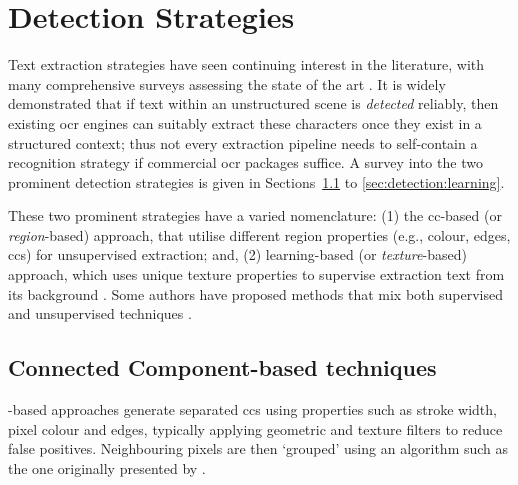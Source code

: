 \section{Detection Strategies}
\label{sec:background:detection_strategies}

Text extraction strategies have seen continuing interest in the literature, with many comprehensive surveys assessing the state of the art \cite{Chen:2000ua, Jung:2004uwa, Zhang:2008vfa, Liang:2005uy, Jung:2004uw}. It is widely demonstrated that if text within an unstructured scene is \textit{detected} reliably, then existing \gls{ocr} engines can suitably extract these characters \citep{Smith:2007dc} once they exist in a structured context; thus not every extraction pipeline needs to self-contain a recognition strategy if commercial \gls{ocr} packages suffice. A survey into the two prominent detection strategies is given in Sections~\ref{sec:detection:cc} to \ref{sec:detection:learning}.

These two prominent strategies have a varied nomenclature: (1) the \gls{cc}-based (or \textit{region}-based) approach, that utilise different region properties (e.g., colour, edges, \glspl{cc}) \citep{Jain:1998wd, Kim:1996tw, Liu:2006wh, Chen:2011ul, Li:2012wd, Zhang:2011cl, Shivakumara:2011dn, Epshtein:2010tj, Zhang:2010wa, Shivakumara:2010wu, Liu:2008tz, Subramanian:2007tf, Lee:2010vv, Sun:2010tg} for unsupervised extraction; and, (2) learning-based (or \textit{texture}-based) approach, which uses unique texture properties to supervise extraction text from its background \citep{Ye:2005wu,XiangrongChen:2004ha,Pan:2010cj,Gllavata:2004vq,Minetto:2010tg,Phan:2009bc,Lee:2003cn,Lienhart:2002ub,Li:2000uf,Wang:2009il,Dalal:2005jq,Hanif:2009tm,Tu:2003tg,Chen:2005wv}. Some authors have proposed methods that mix both supervised and unsupervised techniques \citep{Mutch:2006ub, Mairal:2008uw, Bengio:2006vb}.

\subsection{Connected Component-based techniques}
\label{sec:detection:cc}

-based approaches generate separated \glspl{cc} using properties such as stroke width, pixel colour and edges, typically applying geometric and texture filters to reduce false positives. Neighbouring pixels are then `grouped' using an algorithm such as the one originally presented by \citet{Horn:1986vc}. 

